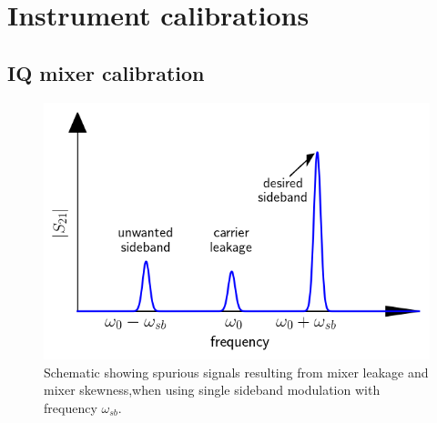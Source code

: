     \section{Instrument calibrations}
      \label{Instrument calibrations}

      \subsection{IQ mixer calibration}
        \label{ssec:Mixer calibration}

        \begin{figure}[tb]
          \centering
          \includegraphics[width=.7\textwidth]{../Figures/Calibration routines/Mixer leakage schematic.png}
          \caption{Schematic showing spurious signals resulting from mixer leakage and mixer skewness,when using single sideband modulation with frequency $\omega_{sb}$.}
          \label{fig:mixer imperfections schematic}
        \end{figure}

